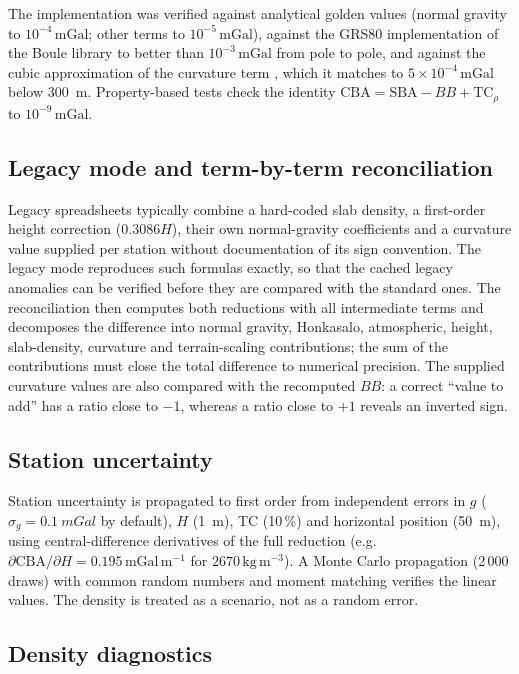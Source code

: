 \documentclass[11pt,a4paper]{article}
\newcommand{\mgal}{\ensuremath{\,\mathrm{mGal}}}
\newcommand{\kgm}{\ensuremath{\,\mathrm{kg\,m^{-3}}}}
\begin{document}
The implementation was verified against analytical golden values (normal gravity to $10^{-4}\mgal$; other terms to $10^{-5}\mgal$), against the GRS80 implementation of the Boule library \citep{Boule} to better than $10^{-3}\mgal$ from pole to pole, and against the cubic approximation of the curvature term \citep{Whitman1991}, which it matches to $5\times10^{-4}\mgal$ below \SI{300}{m}. Property-based tests check the identity $\mathrm{CBA}=\mathrm{SBA}-BB+\mathrm{TC}_\rho$ to $10^{-9}\mgal$.

\subsection{Legacy mode and term-by-term reconciliation}

Legacy spreadsheets typically combine a hard-coded slab density, a first-order height correction ($0.3086H$), their own normal-gravity coefficients and a curvature value supplied per station without documentation of its sign convention. The legacy mode reproduces such formulas exactly, so that the cached legacy anomalies can be verified before they are compared with the standard ones. The reconciliation then computes both reductions with all intermediate terms and decomposes the difference into normal gravity, Honkasalo, atmospheric, height, slab-density, curvature and terrain-scaling contributions; the sum of the contributions must close the total difference to numerical precision. The supplied curvature values are also compared with the recomputed $BB$: a correct ``value to add'' has a ratio close to $-1$, whereas a ratio close to $+1$ reveals an inverted sign.

\subsection{Station uncertainty}

Station uncertainty is propagated to first order from independent errors in $g$ ($\sigma_g=\SI{0.1}{mGal}$ by default), $H$ (\SI{1}{m}), TC (10\,\%) and horizontal position (\SI{50}{m}), using central-difference derivatives of the full reduction (e.g.\ $\partial\mathrm{CBA}/\partial H=0.195\mgal\,\mathrm{m^{-1}}$ for $2670\kgm$). A Monte Carlo propagation (2\,000 draws) with common random numbers and moment matching verifies the linear values. The density is treated as a scenario, not as a random error.

\subsection{Density diagnostics}
\end{document}

